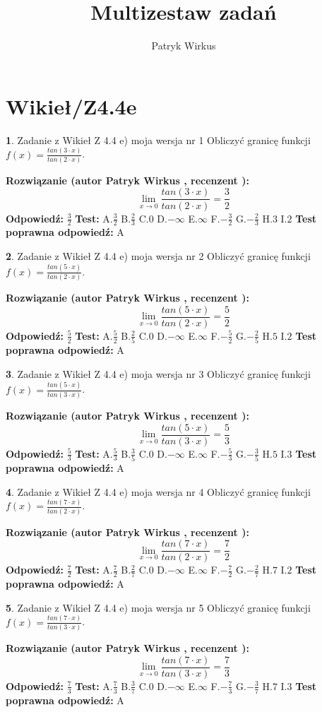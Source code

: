\documentclass[12pt, a4paper]{article}
\title{Multizestaw zadań}
\author{Patryk Wirkus}
\date{}
\theoremstyle{definition} %
\newtheorem{zad}{}
\newcommand{\kategoria}[1]{\section{#1}}
\newcommand{\zadStart}[1]{\begin{zad}#1\newline}
\newcommand{\zadStop}{\end{zad}}
\newcommand{\rozwStart}[2]{\noindent \textbf{Rozwiązanie (autor #1 , recenzent #2): }\newline}
\newcommand{\rozwStop}{\newline}
\newcommand{\odpStart}{\noindent \textbf{Odpowiedź:}\newline}
\newcommand{\odpStop}{\newline}
\newcommand{\testStart}{\noindent \textbf{Test:}\newline}
\newcommand{\testStop}{\newline}
\newcommand{\kluczStart}{\noindent \textbf{Test poprawna odpowiedź:}\newline}
\newcommand{\kluczStop}{\newline}
\begin{document}
\maketitle

\kategoria{Wikieł/Z4.4e}


\zadStart{Zadanie z Wikieł Z 4.4 e) moja wersja nr 1}
Obliczyć granicę funkcji $f(x)=\frac{tan(3\cdot x)}{tan(2\cdot x)}$.
\zadStop
\rozwStart{Patryk Wirkus}{}
$$\lim\limits_{x\to 0}\frac{tan(3\cdot x)}{tan(2\cdot x)}=
\frac{3}{2}$$
\rozwStop
\odpStart
$\frac{3}{2}$
\odpStop
\testStart
A.$\frac{3}{2}$
B.$\frac{2}{3}$
C.$0$
D.$-\infty$
E.$\infty$
F.$-\frac{3}{2}$
G.$-\frac{2}{3}$
H.$3$
I.$2$
\testStop
\kluczStart
A
\kluczStop



\zadStart{Zadanie z Wikieł Z 4.4 e) moja wersja nr 2}
Obliczyć granicę funkcji $f(x)=\frac{tan(5\cdot x)}{tan(2\cdot x)}$.
\zadStop
\rozwStart{Patryk Wirkus}{}
$$\lim\limits_{x\to 0}\frac{tan(5\cdot x)}{tan(2\cdot x)}=
\frac{5}{2}$$
\rozwStop
\odpStart
$\frac{5}{2}$
\odpStop
\testStart
A.$\frac{5}{2}$
B.$\frac{2}{5}$
C.$0$
D.$-\infty$
E.$\infty$
F.$-\frac{5}{2}$
G.$-\frac{2}{5}$
H.$5$
I.$2$
\testStop
\kluczStart
A
\kluczStop



\zadStart{Zadanie z Wikieł Z 4.4 e) moja wersja nr 3}
Obliczyć granicę funkcji $f(x)=\frac{tan(5\cdot x)}{tan(3\cdot x)}$.
\zadStop
\rozwStart{Patryk Wirkus}{}
$$\lim\limits_{x\to 0}\frac{tan(5\cdot x)}{tan(3\cdot x)}=
\frac{5}{3}$$
\rozwStop
\odpStart
$\frac{5}{3}$
\odpStop
\testStart
A.$\frac{5}{3}$
B.$\frac{3}{5}$
C.$0$
D.$-\infty$
E.$\infty$
F.$-\frac{5}{3}$
G.$-\frac{3}{5}$
H.$5$
I.$3$
\testStop
\kluczStart
A
\kluczStop



\zadStart{Zadanie z Wikieł Z 4.4 e) moja wersja nr 4}
Obliczyć granicę funkcji $f(x)=\frac{tan(7\cdot x)}{tan(2\cdot x)}$.
\zadStop
\rozwStart{Patryk Wirkus}{}
$$\lim\limits_{x\to 0}\frac{tan(7\cdot x)}{tan(2\cdot x)}=
\frac{7}{2}$$
\rozwStop
\odpStart
$\frac{7}{2}$
\odpStop
\testStart
A.$\frac{7}{2}$
B.$\frac{2}{7}$
C.$0$
D.$-\infty$
E.$\infty$
F.$-\frac{7}{2}$
G.$-\frac{2}{7}$
H.$7$
I.$2$
\testStop
\kluczStart
A
\kluczStop



\zadStart{Zadanie z Wikieł Z 4.4 e) moja wersja nr 5}
Obliczyć granicę funkcji $f(x)=\frac{tan(7\cdot x)}{tan(3\cdot x)}$.
\zadStop
\rozwStart{Patryk Wirkus}{}
$$\lim\limits_{x\to 0}\frac{tan(7\cdot x)}{tan(3\cdot x)}=
\frac{7}{3}$$
\rozwStop
\odpStart
$\frac{7}{3}$
\odpStop
\testStart
A.$\frac{7}{3}$
B.$\frac{3}{7}$
C.$0$
D.$-\infty$
E.$\infty$
F.$-\frac{7}{3}$
G.$-\frac{3}{7}$
H.$7$
I.$3$
\testStop
\kluczStart
A
\kluczStop
\end{document}
